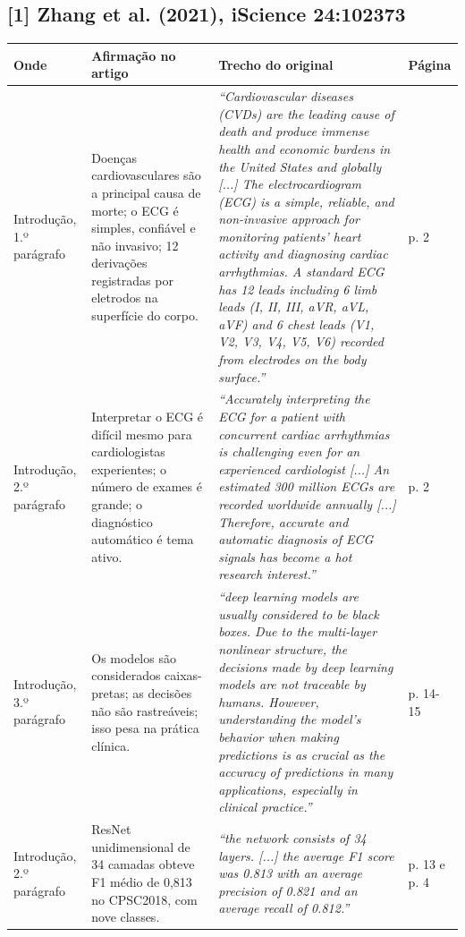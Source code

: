 \documentclass[11pt,a4paper]{article}
\begin{document}
\subsection*{[1] Zhang et al. (2021), iScience 24:102373}
\begin{longtable}{>{\raggedright\arraybackslash}p{2.6cm}>{\raggedright\arraybackslash}p{4.6cm}>{\raggedright\arraybackslash}p{7.6cm}>{\raggedright\arraybackslash}p{1.4cm}}
\toprule
\textbf{Onde} & \textbf{Afirmação no artigo} & \textbf{Trecho do original} & \textbf{Página} \\
\midrule
Introdução, 1.º parágrafo & Doenças cardiovasculares são a principal causa de morte; o ECG é simples, confiável e não invasivo; 12 derivações registradas por eletrodos na superfície do corpo. & \textit{``Cardiovascular diseases (CVDs) are the leading cause of death and produce immense health and economic burdens in the United States and globally [...] The electrocardiogram (ECG) is a simple, reliable, and non-invasive approach for monitoring patients' heart activity and diagnosing cardiac arrhythmias. A standard ECG has 12 leads including 6 limb leads (I, II, III, aVR, aVL, aVF) and 6 chest leads (V1, V2, V3, V4, V5, V6) recorded from electrodes on the body surface.''} & p. 2 \\
\addlinespace
Introdução, 2.º parágrafo & Interpretar o ECG é difícil mesmo para cardiologistas experientes; o número de exames é grande; o diagnóstico automático é tema ativo. & \textit{``Accurately interpreting the ECG for a patient with concurrent cardiac arrhythmias is challenging even for an experienced cardiologist [...] An estimated 300 million ECGs are recorded worldwide annually [...] Therefore, accurate and automatic diagnosis of ECG signals has become a hot research interest.''} & p. 2 \\
\addlinespace
Introdução, 3.º parágrafo & Os modelos são considerados caixas-pretas; as decisões não são rastreáveis; isso pesa na prática clínica. & \textit{``deep learning models are usually considered to be black boxes. Due to the multi-layer nonlinear structure, the decisions made by deep learning models are not traceable by humans. However, understanding the model's behavior when making predictions is as crucial as the accuracy of predictions in many applications, especially in clinical practice.''} & p. 14-15 \\
\addlinespace
Introdução, 2.º parágrafo & ResNet unidimensional de 34 camadas obteve F1 médio de 0,813 no CPSC2018, com nove classes. & \textit{``the network consists of 34 layers. [...] the average F1 score was 0.813 with an average precision of 0.821 and an average recall of 0.812.''} & p. 13 e p. 4 \\

\end{longtable}
\end{document}
